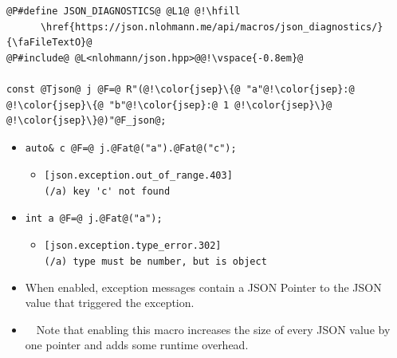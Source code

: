 \documentclass{slides}
\makeatletter
\newcommand{\@slidetitle}{}
\newcommand{\slidetitle}[1]{\renewcommand{\@slidetitle}{#1}}
\makeatother
\begin{document}
\pagebreak
\slidetitle{\lstinline{JSON_DIAGNOSTICS}}

\begin{lstlisting}
@P#define JSON_DIAGNOSTICS@ @L1@ @!\hfill
      \href{https://json.nlohmann.me/api/macros/json_diagnostics/}{\faFileTextO}@
@P#include@ @L<nlohmann/json.hpp>@@!\vspace{-0.8em}@

const @Tjson@ j @F=@ R"(@!\color{jsep}\{@ "a"@!\color{jsep}:@ @!\color{jsep}\{@ "b"@!\color{jsep}:@ 1 @!\color{jsep}\}@ @!\color{jsep}\}@)"@F_json@;
\end{lstlisting}
\vspace{-0.5em}

\begin{itemize}[itemsep=0.2em]
  \item \begin{lstlisting}
auto& c @F=@ j.@Fat@("a").@Fat@("c");
    \end{lstlisting}
    \begin{itemize}
      \item \color{red}\verb|[json.exception.out_of_range.403]| \\
        \verb|(/a) key 'c' not found|
    \end{itemize}

  \item \begin{lstlisting}
int a @F=@ j.@Fat@("a");
    \end{lstlisting}
    \begin{itemize}
      \item \color{red}\verb|[json.exception.type_error.302]| \\
        \verb|(/a) type must be number, but is object|
    \end{itemize}

  \item {\F{18pt} When enabled, exception messages contain a JSON Pointer to
    the JSON value that triggered the exception.}

  \item {\F{18pt} {\color{orange}\faWarning}\ \ Note that enabling this macro increases
    the size of every JSON value by one pointer and adds some runtime overhead.}
\end{itemize}

\pagebreak
\slidetitle{JSON node access}
\end{document}
